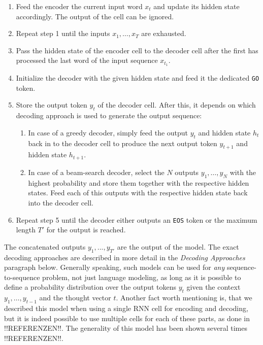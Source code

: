 \begin{enumerate}
	\item Feed the encoder the current input word $x_t$ and update its hidden state accordingly. The output of the cell can be ignored.
	\item Repeat step 1 until the inputs $x_1,\dots,x_{T}$ are exhausted.
	\item Pass the hidden state of the encoder cell to the decoder cell after the first has processed the last word of the input sequence $x_{t_1}$.
	\item Initialize the decoder with the given hidden state and feed it the dedicated \texttt{GO} token.
	\item Store the output token $y_t$ of the decoder cell. After this, it depends on which decoding approach is used to generate the output sequence:
	\begin{enumerate}
		\item In case of a greedy decoder, simply feed the output $y_t$ and hidden state $h_t$ back in to the decoder cell to produce the next output token $y_{t+1}$ and hidden state $h_{t+1}$.
		\item In case of a beam-search decoder, select the $N$ outputs $y_1,\dots,y_{N}$ with the highest probability and store them together with the respective hidden states. Feed each of this outputs with the respective hidden state back into the decoder cell.
	\end{enumerate}
	\item Repeat step 5 until the decoder either outputs an \texttt{EOS} token or the maximum length $T'$ for the output is reached.
\end{enumerate}

The concatenated outputs $y_1,...,y_{T'}$ are the output of the model. The exact decoding approaches are described in more detail in the \emph{Decoding Approaches} paragraph below. Generally speaking, such models can be used for \emph{any} sequence-to-sequence problem, not just language modeling, as long as it is possible to define a probability distribution over the output tokens $y_t$ given the context $y_1, \dots, y_{t-1}$ and the thought vector $t$. Another fact worth mentioning is, that we described this model when using a single RNN cell for encoding and decoding, but it is indeed possible to use multiple cells for each of these parts, as done in !!REFERENZEN!!. The generality of this model has been shown several times !!REFERENZEN!!.

